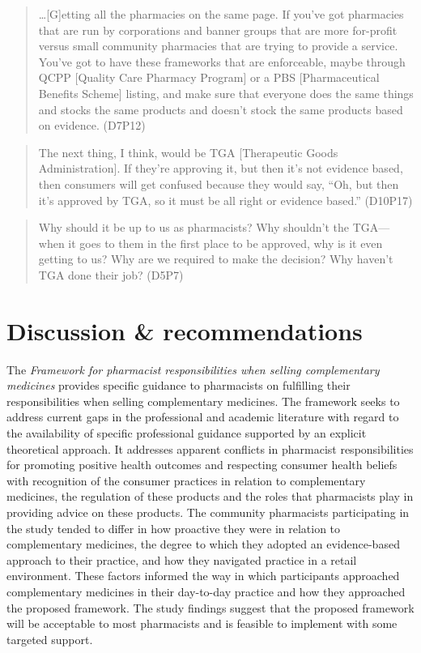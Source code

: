 \documentclass[12pt,]{article}
\begin{document}
\begin{quote}
\ldots{}{[}G{]}etting all the pharmacies on the same page. If you've got
pharmacies that are run by corporations and banner groups that are more
for-profit versus small community pharmacies that are trying to provide
a service. You've got to have these frameworks that are enforceable,
maybe through QCPP {[}Quality Care Pharmacy Program{]} or a PBS
{[}Pharmaceutical Benefits Scheme{]} listing, and make sure that
everyone does the same things and stocks the same products and doesn't
stock the same products based on evidence. (D7P12)
\end{quote}

\begin{quote}
The next thing, I think, would be TGA {[}Therapeutic Goods
Administration{]}. If they're approving it, but then it's not evidence
based, then consumers will get confused because they would say, ``Oh,
but then it's approved by TGA, so it must be all right or evidence
based.'' (D10P17)
\end{quote}

\begin{quote}
Why should it be up to us as pharmacists? Why shouldn't the TGA---when
it goes to them in the first place to be approved, why is it even
getting to us? Why are we required to make the decision? Why haven't TGA
done their job? (D5P7)
\end{quote}

\section{Discussion \&
recommendations}\label{discussion-recommendations}

The \emph{Framework for pharmacist responsibilities when selling
complementary medicines} provides specific guidance to pharmacists on
fulfilling their responsibilities when selling complementary medicines.
The framework seeks to address current gaps in the professional and
academic literature with regard to the availability of specific
professional guidance supported by an explicit theoretical approach. It
addresses apparent conflicts in pharmacist responsibilities for
promoting positive health outcomes and respecting consumer health
beliefs with recognition of the consumer practices in relation to
complementary medicines, the regulation of these products and the roles
that pharmacists play in providing advice on these products. The
community pharmacists participating in the study tended to differ in how
proactive they were in relation to complementary medicines, the degree
to which they adopted an evidence-based approach to their practice, and
how they navigated practice in a retail environment. These factors
informed the way in which participants approached complementary
medicines in their day-to-day practice and how they approached the
proposed framework. The study findings suggest that the proposed
framework will be acceptable to most pharmacists and is feasible to
implement with some targeted support.
\end{document}
